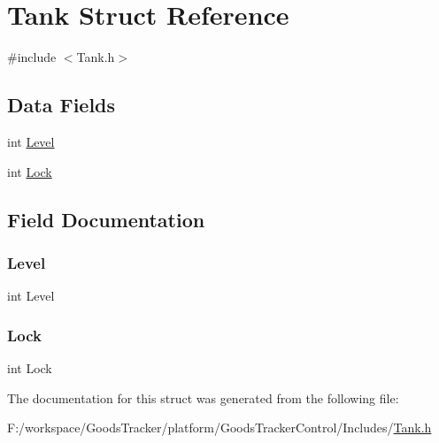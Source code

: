 \hypertarget{struct_tank}{}\section{Tank Struct Reference}
\label{struct_tank}


{\ttfamily \#include $<$Tank.\+h$>$}

\subsection*{Data Fields}
\begin{DoxyCompactItemize}
\item 
int \hyperlink{struct_tank_a879a93f9d2ab803bb4ca7f9bd55e52f8}{Level}
\item 
int \hyperlink{struct_tank_adc7fab35ef83e757018e801343d4da44}{Lock}
\end{DoxyCompactItemize}


\subsection{Field Documentation}
\mbox{\label{struct_tank_a879a93f9d2ab803bb4ca7f9bd55e52f8}} 
\subsubsection{\texorpdfstring{Level}{Level}}
{\footnotesize\ttfamily int Level}

\mbox{\label{struct_tank_adc7fab35ef83e757018e801343d4da44}} 
\subsubsection{\texorpdfstring{Lock}{Lock}}
{\footnotesize\ttfamily int Lock}



The documentation for this struct was generated from the following file\+:\begin{DoxyCompactItemize}
\item 
F\+:/workspace/\+Goods\+Tracker/platform/\+Goods\+Tracker\+Control/\+Includes/\hyperlink{_tank_8h}{Tank.\+h}\end{DoxyCompactItemize}
